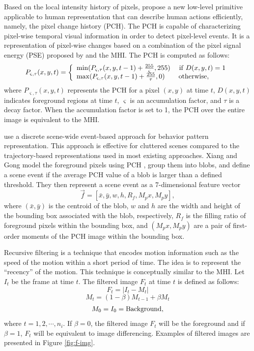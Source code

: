 Based on the local intensity history of
pixels,  propose a new low-level primitive
applicable to human representation that can describe human actions
efficiently, namely, the pixel change history (PCH).  The PCH is
capable of characterizing pixel-wise temporal visual information in
order to detect pixel-level events. It is a representation of
pixel-wise changes based on a combination of the pixel signal energy
(PSE) proposed by  and the MHI. The PCH is
computed as follows:
\[
  P_{\varsigma ,\tau } (x,y,t) = \left\{ \begin{array}{l}
  \min (P_{\varsigma ,\tau } (x,y,t - 1) + \frac{{255}}{\varsigma },255)\quad 
  \; {\rm if}\;D(x,y,t) = 1 \\ 
  \max (P_{\varsigma ,\tau } (x,y,t - 1) + \frac{{255}}{\tau },0)\quad \quad 
  {\rm otherwise}, \\ 
  \end{array} \right.
\]
where $P_{\varsigma ,\tau } (x,y,t)$ represents the PCH for a pixel
$(x,y)$ at time $t$, $D(x,y,t)$ indicates foreground regions at time
$t$, $\varsigma$ is an accumulation factor, and $\tau$ is a decay
factor. When the accumulation factor is set to 1, the PCH over the
entire image is equivalent to the MHI. 

 use a discrete scene-wide event-based
approach for behavior pattern representation. This approach is
effective for cluttered scenes compared to the trajectory-based
representations used in most existing approaches. Xiang and Gong model
the foreground pixels using PCH , group them
into blobs, and define a scene event if the average PCH value of a blob is
larger than a defined threshold. They then represent a scene event as
a 7-dimensional feature vector
\[
  \vec{f} = [ \bar{x}, \bar{y} , w, h, R_f , M_px, M_py],
\]
where $(\bar{x}, \bar{y})$ is the centroid of the blob, $w$ and $h$
are the width and height of the bounding box associated with the blob,
respectively, $R_f$ is the filling ratio of foreground pixels within
the bounding box, and $(M_px, M_py)$ are a pair of first-order moments
of the PCH image within the bounding box. 

Recursive filtering is a technique
that encodes motion information such as the speed of the motion within
a short period of time. The idea is to represent the ``recency'' of
the motion. This technique is conceptually similar to the MHI. Let
$I_t$ be the frame at time $t$. The filtered image $F_t$ at time $t$
is defined as follows:
\[
  F_t = \left| {I_t  - M_t } \right|
\]
\[
  M_t = (1 - \beta)M_{t - 1}  + \beta M_t 
\]
\[
  M_0 = I_0 = {\rm Background},
\]
where $t = 1, 2, \cdots, n_i$. If $\beta = 0$, the filtered image
$F_t$ will be the foreground and if $\beta = 1$, $F_t$ will be
equivalent to image differencing. Examples of filtered images are
presented in Figure \ref{fig:f-img}.

